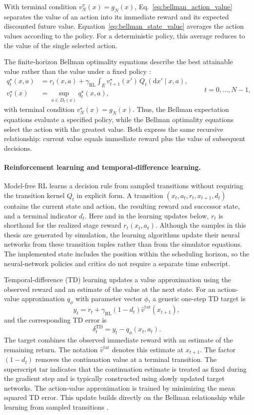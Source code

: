 \documentclass[12pt]{article}
\begin{document}
With terminal condition $v_N^\pi(x)=g_N(x)$, Eq.~\eqref{eq:bellman_action_value} separates the value of an action into its immediate reward and its expected discounted future value. Equation~\eqref{eq:bellman_state_value} averages the action values according to the policy. For a deterministic policy, this average reduces to the value of the single selected action.

The finite-horizon Bellman optimality equations describe the best attainable value rather than the value under a fixed policy \cite{baeuerle2011markov}:
\[
\begin{aligned}
q_t^\star(x,a)
&=r_t(x,a)+\gamma_{\mathrm{RL}}
  \int_E v_{t+1}^\star(x')\,Q_t(\mathrm{d}x'\mid x,a),\\
v_t^\star(x)
&=\sup_{a\in D_t(x)}q_t^\star(x,a),
\end{aligned}
\qquad t=0,\ldots,N-1,
\]
with terminal condition $v_N^\star(x)=g_N(x)$. Thus, the Bellman expectation equations evaluate a specified policy, while the Bellman optimality equations select the action with the greatest value. Both express the same recursive relationship: current value equals immediate reward plus the value of subsequent decisions.

\paragraph{Reinforcement learning and temporal-difference learning.}
Model-free RL learns a decision rule from sampled transitions without requiring the transition kernel $Q_t$ in explicit form. A transition $(x_t,a_t,r_t,x_{t+1},d_t)$ contains the current state and action, the resulting reward and successor state, and a terminal indicator $d_t$. Here and in the learning updates below, $r_t$ is shorthand for the realized stage reward $r_t(x_t,a_t)$. Although the samples in this thesis are generated by simulation, the learning algorithms update their neural networks from these transition tuples rather than from the simulator equations. The implemented state includes the position within the scheduling horizon, so the neural-network policies and critics do not require a separate time subscript.

Temporal-difference (TD) learning updates a value approximation using the observed reward and an estimate of the value at the next state. For an action-value approximation $q_\phi$ with parameter vector $\phi$, a generic one-step TD target is
\[
y_t=r_t+\gamma_{\mathrm{RL}}(1-d_t)\widehat v^{\mathrm{tar}}(x_{t+1}),
\]
and the corresponding TD error is
\[
\delta_t^{\mathrm{TD}}=y_t-q_\phi(x_t,a_t).
\]
The target combines the observed immediate reward with an estimate of the remaining return. The notation $\widehat v^{\mathrm{tar}}$ denotes this estimate at $x_{t+1}$. The factor $(1-d_t)$ removes the continuation value at a terminal transition. The superscript $\mathrm{tar}$ indicates that the continuation estimate is treated as fixed during the gradient step and is typically constructed using slowly updated target networks. The action-value approximation is trained by minimizing the mean squared TD error. This update builds directly on the Bellman relationship while learning from sampled transitions \cite{sutton2018reinforcement}.
\end{document}
